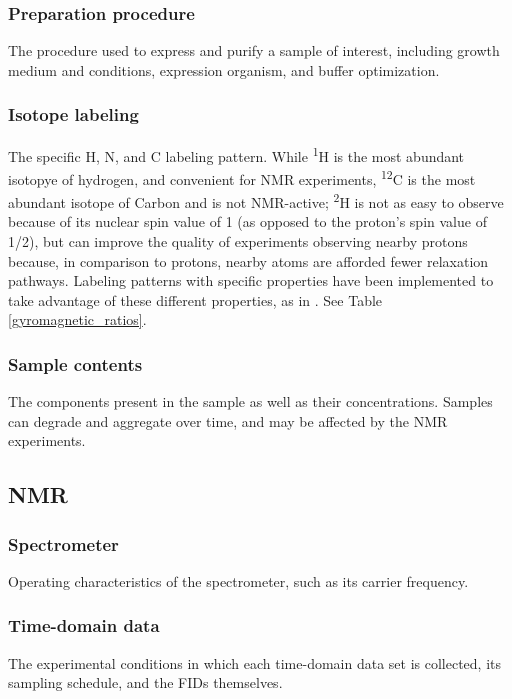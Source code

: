 \subsubsection{Preparation procedure}
The procedure used to express and purify a sample of interest, including
growth medium and conditions, expression organism, and buffer optimization.

\subsubsection{Isotope labeling}
The specific H, N, and C labeling pattern.  While \textsuperscript{1}H is 
the most abundant isotopye of hydrogen, and convenient for NMR experiments,
\textsuperscript{12}C is the most abundant isotope of Carbon and is not 
NMR-active; \textsuperscript{2}H is not as easy to observe because of
its nuclear spin value of 1 (as opposed to the proton's spin value of 1/2),
but can improve the quality of experiments observing nearby protons because,
in comparison to protons, nearby atoms are afforded fewer relaxation pathways.
Labeling patterns with specific properties have been implemented to take
advantage of these different properties, as in \cite{sail_flya}.
See Table \ref{gyromagnetic_ratios}.

\subsubsection{Sample contents}
The components present in the sample as well as their concentrations.
Samples can degrade and aggregate over time, and may be affected by the
NMR experiments.

\subsection*{NMR}

\subsubsection{Spectrometer}
Operating characteristics of the spectrometer, such as its carrier frequency.

\subsubsection{Time-domain data}
The experimental conditions in which each time-domain data set is collected, 
its sampling schedule, and the FIDs themselves.

